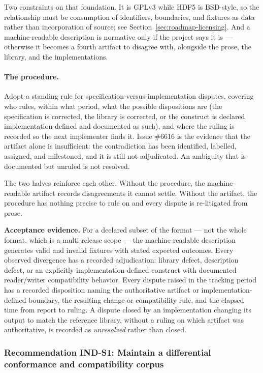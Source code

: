 \documentclass[../main.tex]{subfiles}
\begin{document}
Two constraints on that foundation. It is GPLv3 while HDF5 is BSD-style, so
the relationship must be consumption of identifiers, boundaries, and fixtures
as data rather than incorporation of source; see
Section~\ref{sec:roadmap-licensing}. And a machine-readable description is
normative only if the project says it is --- otherwise it becomes a fourth
artifact to disagree with, alongside the prose, the library, and the
implementations.

\paragraph{The procedure.}
Adopt a standing rule for specification-versus-implementation disputes,
covering who rules, within what period, what the possible dispositions are
(the specification is corrected, the library is corrected, or the construct is
declared implementation-defined and documented as such), and where the ruling
is recorded so the next implementer finds it. Issue \#6616 is the evidence that
the artifact alone is insufficient: the contradiction has been identified,
labelled, assigned, and milestoned, and it is still not adjudicated. An
ambiguity that is documented but unruled is not resolved.

The two halves reinforce each other. Without the procedure, the machine-readable
artifact records disagreements it cannot settle. Without the artifact, the
procedure has nothing precise to rule on and every dispute is re-litigated from
prose.

\noindent\textbf{Acceptance evidence.}
For a declared subset of the format --- not the whole format, which is a
multi-release scope --- the machine-readable description generates valid and
invalid fixtures with stated expected outcomes. Every observed divergence has
a recorded adjudication: library defect, description defect, or an explicitly
implementation-defined construct with documented reader/writer compatibility
behavior. Every dispute raised in the tracking period has a recorded
disposition naming the authoritative artifact or implementation-defined
boundary, the resulting change or compatibility rule, and the elapsed time from
report to ruling.
A dispute closed by an implementation changing its output to match the
reference library, without a ruling on which artifact was authoritative, is
recorded as \emph{unresolved} rather than closed.

\subsubsection*{Recommendation IND-S1: Maintain a differential conformance and compatibility corpus}
\end{document}

